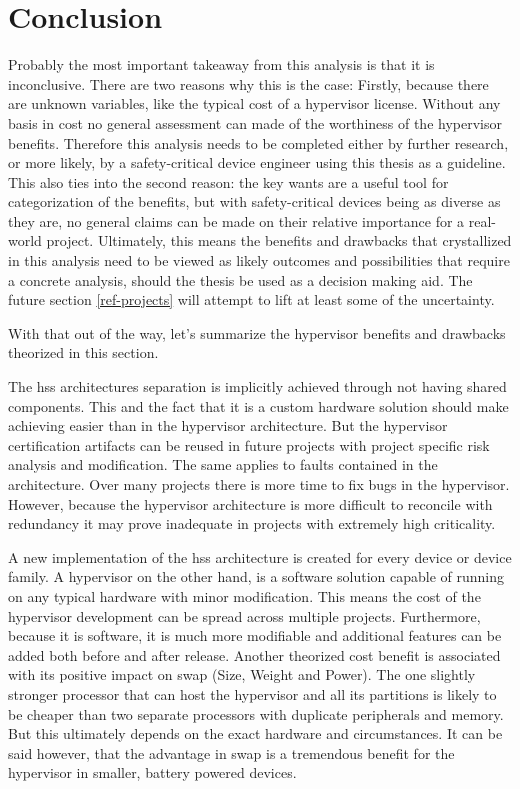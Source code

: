 \section{Conclusion}
Probably the most important takeaway from this analysis is that it is inconclusive. There are two reasons why this is the case: Firstly, because there are unknown variables, like the typical cost of a hypervisor license. Without any basis in cost no general assessment can made of the worthiness of the hypervisor benefits. Therefore this analysis needs to be completed either by further research, or more likely, by a safety-critical device engineer using this thesis as a guideline. This also ties into the second reason: the key wants are a useful tool for categorization of the benefits, but with safety-critical devices being as diverse as they are, no general claims can be made on their relative importance for a real-world project. Ultimately, this means the benefits and drawbacks that crystallized in this analysis need to be viewed as likely outcomes and possibilities that require a concrete analysis, should the thesis be used as a decision making aid. The future section \ref{ref-projects} will attempt to lift at least some of the uncertainty.

With that out of the way, let's summarize the hypervisor benefits 
and drawbacks theorized in this section.

The \acrshort{hss} architectures separation is implicitly achieved through not having shared components. This and the fact that it is a custom hardware solution should make achieving  easier than in the hypervisor architecture. But the hypervisor certification artifacts can be reused in future projects with project specific risk analysis and modification. The same applies to faults contained in the architecture. Over many projects there is more time to fix bugs in the hypervisor. However, because the hypervisor architecture is more difficult to reconcile with redundancy it may prove inadequate in projects with extremely high criticality.

A new implementation of the \acrshort{hss} architecture is created for every device or device family. A hypervisor on the other hand, is a software solution capable of running on any typical hardware with minor modification. This means the cost of the hypervisor development can be spread across multiple projects. Furthermore, because it is software, it is much more modifiable and additional features can be added both before and after release. Another theorized cost benefit is associated with its positive impact on \acrshort{swap} (Size, Weight and Power). The one slightly stronger processor that can host the hypervisor and all its partitions is likely to be cheaper than two separate processors with duplicate peripherals and memory. But this ultimately depends on the exact hardware and circumstances. It can be said however, that the advantage in \acrshort{swap} is a tremendous benefit for the hypervisor in smaller, battery powered devices.

